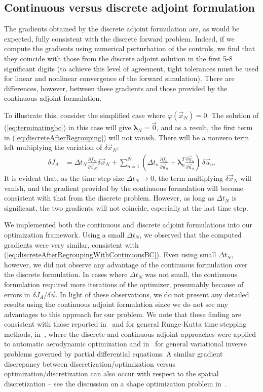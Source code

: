 \documentclass[twocolumn,numbook]{svjour3}          %
\newcommand{\fsum}[3]{\sum_{#1}^{#2}{#3}}
\newcommand{\pder}[2]{\frac{\partial #1}{\partial #2}}
\def\u{{\vec u}}
\def\x{{\vec x}}
\def\p{{\vec{g}}}
\def\0{{\vec 0}}
\def\blambda{{\pmb{\lambda}}}%
\def\M{{\varphi}}
\def\F{f}
\def\myobj{J}
\begin{document}
\subsection{Continuous versus discrete adjoint formulation}
The gradients obtained by the discrete adjoint formulation are, as would be
expected, fully consistent with the discrete forward problem. Indeed, if we
compute the gradients using numerical perturbation of the controls, we find that
they coincide with those from the discrete adjoint solution in the first 5-8
significant digits (to achieve this level of agreement, tight tolerances must be
used for linear and nonlinear convergence of the forward simulation). There are differences, however,
between these gradients and those provided by the continuous adjoint
formulation.

To illustrate this, consider
the simplified case where $\M(\x_N) = 0$. The solution of
(\ref{eq:terminatingbc}) in this case will give $\blambda_N = \0$,
and as a result, the first term in (\ref{eq:discreteAfterRegrouping})
will not vanish. There will be a nonzero term left multiplying the
variation of $\delta \x_N$:
%
\begin{align}
\label{eq:discreteAfterRegroupingWithContinuousBC}
  \delta \myobj_A &=
  \Delta t_N \pder{\F_N}{\x_N} \delta \x_N
  +\fsum{n=1}{N}{
      \left (
        \Delta t_n \pder{\F_n}{\u_n}
        +\blambda^T_n\pder{\p_n}{\u_n}
      \right ) \, \delta \u_n.
    }
\end{align}
It is evident that, as the time step size $\Delta t_N \rightarrow 0$,
the term multiplying $\delta \x_N$ will vanish, and the gradient provided by the continuous
formulation will become consistent with that from the discrete problem.
However, as long as $\Delta t_N$ is significant, the two gradients
will not coincide, especially at the last time step.



We implemented both the continuous and discrete adjoint formulations into our
optimization framework. Using a small $\Delta t_N$, we observed that the
computed gradients were very similar, consistent with
(\ref{eq:discreteAfterRegroupingWithContinuousBC}). Even using small $\Delta
t_N$, however, we did not observe any advantage of the continuous formulation
over the discrete formulation. In cases where $\Delta t_N$ was not small, the
continuous formulation required more iterations of the optimizer, presumably
because of errors in $\delta \myobj_A / \delta \u$. In light of these observations,
we do not present any detailed results using the continuous adjoint
formulation since we do not see any advantages to this approach for our
problem. We note that these finding are consistent with those reported
in~\cite{Hager2000} and \cite{Walther2007} for general Runge-Kutta
time stepping methods, 
in~\cite{Nadarajah:2000}, where the discrete and continuous adjoint
approaches were applied to automatic  aerodynamic optimization and
in~\cite{Petra2011} for general variational inverse problems governed
by partial differential equations. A
 similar gradient discrepancy between discretization/optimization
 versus optimization/discretization can also occur with respect to the
 spatial discretization -- see the discussion on a shape
 optimization problem in~\cite{GunzburgerBook}. 
\end{document}
